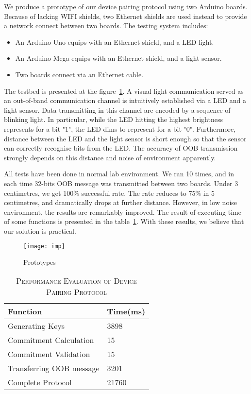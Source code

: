We produce a prototype of our device pairing protocol using two Arduino boards. Because of lacking WIFI shields, two Ethernet shields are used instead to provide a network connect between two boards. The testing system includes:
\begin{itemize}
\item An Arduino Uno equips with an Ethernet shield, and a LED light.
\item An Arduino Mega equips with an Ethernet shield, and a light sensor.
\item Two boards connect via an Ethernet cable. 
\end{itemize}

The testbed is presented at the figure~\ref{imp}. A visual light communication served as an out-of-band communication channel is intuitively established via a LED and a light sensor. Data transmitting in this channel are encoded by a sequence of blinking light. In particular, while the LED hitting the highest brightness represents for a bit "1", the LED dims to represent for a bit "0". Furthermore, distance between the LED and the light sensor is short enough so that the sensor can correctly recognise bits from the LED. The accuracy of OOB transmission strongly depends on this distance and noise of environment apparently. 

All tests have been done in normal lab environment. We ran 10 times, and in each time 32-bits OOB message was transmitted between two boards. Under 3 centimetres, we get 100\% successful rate. The rate reduces to 75\% in 5 centimetres, and dramatically drops at further distance. However, in low noise environment, the results are remarkably improved. The result of executing time of some functions is presented in the table~\ref{evaluation}. With these results, we believe that our solution is practical.

\begin{figure}
  \centering
  \texttt{[image: imp]}
  \caption{Prototypes}
  \label{imp}
\end{figure}

\begin{table}[t]
\centering
\caption{\textsc{Performance Evaluation of Device Pairing Protocol}}
\label{evaluation}
{\small
\begin{tabular}{| p{5cm} | p{3cm} |}
 \hline
\textbf{Function} & \textbf{Time(ms)} \\ \hline \hline
Generating Keys & 3898 \\ \hline
Commitment Calculation & 15 \\ \hline
Commitment Validation & 15 \\ \hline
Transferring OOB message & 3201 \\ \hline
Complete Protocol & 21760 \\ \hline
\end{tabular}
}
\end{table}


